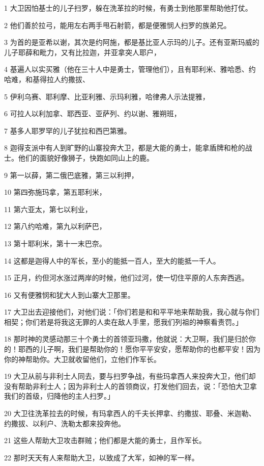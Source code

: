 \par 1 大卫因怕基士的儿子扫罗，躲在洗革拉的时候，有勇士到他那里帮助他打仗。
\par 2 他们善於拉弓，能用左右两手甩石射箭，都是便雅悯人扫罗的族弟兄。
\par 3 为首的是亚希以谢，其次是约阿施，都是基比亚人示玛的儿子。还有亚斯玛威的儿子耶薛和毗力，又有比拉迦，并亚拿突人耶户，
\par 4 基遍人以实买雅（他在三十人中是勇士，管理他们），且有耶利米、雅哈悉、约哈难，和基得拉人约撒拔、
\par 5 伊利乌赛、耶利摩、比亚利雅、示玛利雅，哈律弗人示法提雅，
\par 6 可拉人以利加拿、耶西亚、亚萨列、约以谢、雅朔班，
\par 7 基多人耶罗罕的儿子犹拉和西巴第雅。
\par 8 迦得支派中有人到旷野的山寨投奔大卫，都是大能的勇士，能拿盾牌和枪的战士。他们的面貌好像狮子，快跑如同山上的鹿。
\par 9 第一以薛，第二俄巴底雅，第三以利押，
\par 10 第四弥施玛拿，第五耶利米，
\par 11 第六亚太，第七以利业，
\par 12 第八约哈难，第九以利萨巴，
\par 13 第十耶利米，第十一末巴奈。
\par 14 这都是迦得人中的军长，至小的能抵一百人，至大的能抵一千人。
\par 15 正月，约但河水涨过两岸的时候，他们过河，使一切住平原的人东奔西逃。
\par 16 又有便雅悯和犹大人到山寨大卫那里。
\par 17 大卫出去迎接他们，对他们说：「你们若是和和平平地来帮助我，我心就与你们相契；你们若是将我这无罪的人卖在敌人手里，愿我们列祖的神察看责罚。」
\par 18 那时神的灵感动那三十个勇士的首领亚玛撒，他就说：大卫啊，我们是归於你的！耶西的儿子啊，我们是帮助你的！愿你平平安安，愿帮助你的也都平安！因为你的神帮助你。大卫就收留他们，立他们作军长。
\par 19 大卫从前与非利士人同去，要与扫罗争战，有些玛拿西人来投奔大卫，他们却没有帮助非利士人；因为非利士人的首领商议，打发他们回去，说：「恐怕大卫拿我们的首级，归降他的主人扫罗。」
\par 20 大卫往洗革拉去的时候，有玛拿西人的千夫长押拿、约撒拔、耶叠、米迦勒、约撒拔、以利户、洗勒太都来投奔他。
\par 21 这些人帮助大卫攻击群贼；他们都是大能的勇士，且作军长。
\par 22 那时天天有人来帮助大卫，以致成了大军，如神的军一样。
